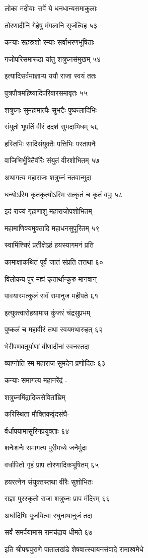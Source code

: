 लोका मदीयाः सर्वे ये धनधान्यसमाकुलाः

तोरणादीनि गेहेषु मंगलानि सृजंत्विह ५३

कन्याः सहस्रशो रम्याः सर्वाभरणभूषिताः

गजोपरिसमारूढा यांतु शत्रुघ्नसंमुखम् ५४

इत्यादिसर्वमाज्ञाप्य ययौ राजा स्वयं ततः

पुत्रपौत्रमहिष्यादिपरिवारसमावृतः ५५

शत्रुघ्नः सुमहामात्यैः सुभटैः पुष्कलादिभिः

संयुतो भूपतिं वीरं ददर्श सुमदाभिधम् ५६

हस्तिभिः सादिसंयुक्तैः पत्तिभिः परतापनैः

वाजिभिर्भूषितैर्वीरैः संयुतं वीरशोभितम् ५७

अथागत्य महाराजः शत्रुघ्नं नतवान्मुदा

धन्योऽस्मि कृतकृत्योऽस्मि सत्कृतं च कृतं वपुः ५८

इदं राज्यं गृहाणाशु महाराजोपशोभितम्

महामाणिक्यमुक्तादि महाधनसुपूरितम् ५९

स्वामिंश्चिरं प्रतीक्षेऽहं हयस्यागमनं प्रति

कामाक्षाकथितं पूर्वं जातं संप्रति तत्तथा ६०

विलोकय पुरं मह्यं कृतार्थान्कुरु मानवान्

पावयास्मत्कुलं सर्वं रामानुज महीपते ६१

इत्युक्त्वारोहयामास कुंजरं चंद्रसुप्रभम्

पुष्कलं च महावीरं तथा स्वयमथारुहत् ६२

भेरीपणवतूर्याणां वीणादीनां स्वनस्तदा

व्याप्नोति स्म महाराज सुमदेन प्रणोदितः ६३

कन्याः समागत्य महानरेंद्रं -

शत्रुघ्नमिंद्रादिकसेवितांघ्रिम्

करिस्थिता मौक्तिकवृंदसंघै-

र्वर्धापयामासुरिनप्रयुक्ताः ६४

शनैःशनैः समागत्य पुरीमध्ये जनैर्मुदा

वर्धापितो गृहं प्राप तोरणादिकभूषितम् ६५

हयरत्नेन संयुक्तस्तथा वीरैः सुशोभितः

राज्ञा पुरस्कृतो राजा शत्रुघ्नः प्राप मंदिरम् ६६

अर्घादिभिः पूजयित्वा रघुनाथानुजं तदा

सर्वं समर्पयामास रामचंद्राय धीमते ६७

इति श्रीपद्मपुराणे पातालखंडे शेषवात्स्यायनसंवादे रामाश्वमेधे

